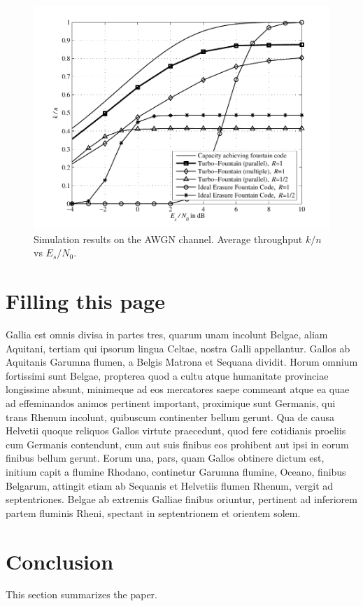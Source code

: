 \documentclass[journal, a4paper]{IEEEtran}
\begin{document}
    \begin{figure}[!hbt]
        \begin{center}
        \includegraphics[width=\columnwidth]{plot_tf}
        \caption{Simulation results on the AWGN channel. Average throughput $k/n$ vs $E_s/N_0$.}
        \label{fig:tf_plot}
        \end{center}
    \end{figure}

\section{Filling this page}
    Gallia est omnis divisa in partes tres, quarum unam incolunt Belgae, aliam Aquitani, tertiam qui ipsorum lingua Celtae, nostra Galli appellantur. Gallos ab Aquitanis Garumna flumen, a Belgis Matrona et Sequana dividit. Horum omnium fortissimi sunt Belgae, propterea quod a cultu atque humanitate provinciae longissime absunt, minimeque ad eos mercatores saepe commeant atque ea quae ad effeminandos animos pertinent important, proximique sunt Germanis, qui trans Rhenum incolunt, quibuscum continenter bellum gerunt. Qua de causa Helvetii quoque reliquos Gallos virtute praecedunt, quod fere cotidianis proeliis cum Germanis contendunt, cum aut suis finibus eos prohibent aut ipsi in eorum finibus bellum gerunt. Eorum una, pars, quam Gallos obtinere dictum est, initium capit a flumine Rhodano, continetur Garumna flumine, Oceano, finibus Belgarum, attingit etiam ab Sequanis et Helvetiis flumen Rhenum, vergit ad septentriones. Belgae ab extremis Galliae finibus oriuntur, pertinent ad inferiorem partem fluminis Rheni, spectant in septentrionem et orientem solem.

\section{Conclusion}
    This section summarizes the paper.
\nocite{5}



\end{document}
